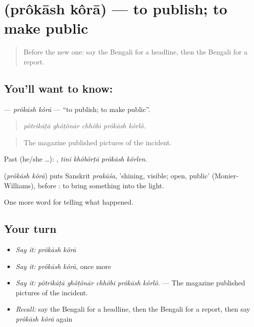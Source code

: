 \section[\texorpdfstring{\bn{প্রকাশ} \bn{করা} (prôkāsh kôrā)}{প্রকাশ করা (prôkāsh kôrā)}]{  (prôkāsh kôrā) — to publish; to make public}

\label{lesson:BN-C296-prokash-kora}



\begin{quote}
Before the new one: say the Bengali for a headline, then the Bengali for a report.
\end{quote}

\subsection*{You'll want to know:  }
\textbf{ } — \emph{prôkāsh kôrā} — \textquotedblleft{}to publish; to make public\textquotedblright{}.

\begin{quote}
    
\end{quote}

\begin{quote}
\emph{pôtrikāṭā ghôṭônār chhôbi prôkāsh kôrlô.}
\end{quote}

\begin{quote}
The magazine published pictures of the incident.
\end{quote}

Past (he/she …):    , \emph{tini khôbôrṭā prôkāsh kôrlen}.

\begin{cousinweb}
\textbf{ } (\emph{prôkāsh kôrā}) puts Sanskrit \emph{prakāśa}, 'shining, visible; open, public' (Monier-Williams), before : to bring something into the light.
\end{cousinweb}

\begin{grammarlens}[title={What you've built}]
One more word for telling what happened.
\end{grammarlens}

\subsection*{Your turn}
\begin{itemize}
\raggedright
  \item \emph{Say it:} \emph{prôkāsh kôrā}
  \item \emph{Say it:} \emph{prôkāsh kôrā}, once more
  \item \emph{Say it:} \emph{pôtrikāṭā ghôṭônār chhôbi prôkāsh kôrlô.} — The magazine published pictures of the incident.
  \item \emph{Recall:} say the Bengali for a headline, then the Bengali for a report, then say \emph{prôkāsh kôrā} again
\end{itemize}


